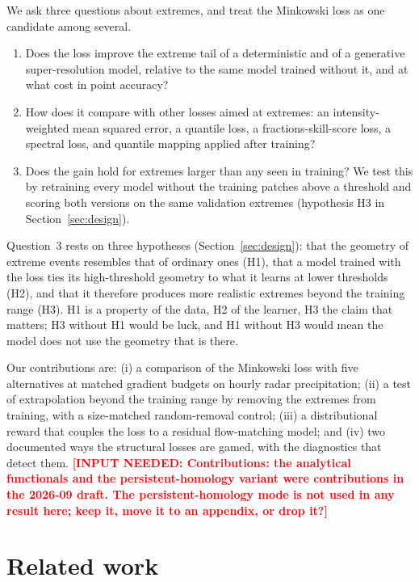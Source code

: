 \documentclass{article}
\newcommand{\needinput}[1]{\textcolor{red}{\textbf{[INPUT NEEDED: #1]}}}
\begin{document}
We ask three questions about extremes, and treat the Minkowski loss as one candidate among several.
\begin{enumerate}
  \item Does the loss improve the extreme tail of a deterministic and of a generative super-resolution model,
  relative to the same model trained without it, and at what cost in point accuracy?
  \item How does it compare with other losses aimed at extremes: an intensity-weighted mean squared error, a
  quantile loss, a fractions-skill-score loss, a spectral loss, and quantile mapping applied after training?
  \item Does the gain hold for extremes larger than any seen in training? We test this by retraining every model
  without the training patches above a threshold and scoring both versions on the same validation extremes
  (hypothesis H3 in Section~\ref{sec:design}).
\end{enumerate}
Question~3 rests on three hypotheses (Section~\ref{sec:design}): that the geometry of extreme events resembles that
of ordinary ones (H1), that a model trained with the loss ties its high-threshold geometry to what it learns at lower
thresholds (H2), and that it therefore produces more realistic extremes beyond the training range (H3). H1 is a
property of the data, H2 of the learner, H3 the claim that matters; H3 without H1 would be luck, and H1 without H3 would
mean the model does not use the geometry that is there.

Our contributions are: (i) a comparison of the Minkowski loss with five alternatives at matched gradient budgets on
hourly radar precipitation; (ii) a test of extrapolation beyond the training range by removing the extremes from
training, with a size-matched random-removal control; (iii) a distributional reward that couples the loss to a
residual flow-matching model; and (iv) two documented ways the structural losses are gamed, with the diagnostics
that detect them. \needinput{Contributions: the analytical functionals and the persistent-homology variant were
contributions in the 2026-09 draft. The persistent-homology mode is not used in any result here; keep it, move it
to an appendix, or drop it?}

\section{Related work}
\end{document}

